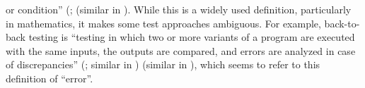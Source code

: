 \begin{enumerate}
          or condition'' \ifnotpaper (\citealp[p.~128]{IEEE2010}; \else
              \cite[p.~128]{IEEE2010} (\fi similar in
          \citealp[pp.~17\=/18 to 17\=/19, 18\=/7 to 18\=/8]{SWEBOK2024}).
          While this is a widely used definition, particularly in mathematics,
          it makes some test approaches ambiguous.
          For example, back-to-back
          testing is ``testing in which two or more variants of a program are
          executed with the same inputs, the outputs are compared, and errors
          are analyzed in case of discrepancies'' \ifnotpaper
              (\citealp[p.~30]{IEEE2010}; similar in \citealpISTQB{})\else
              \cite[p.~30]{IEEE2010} (similar in \cite{ISTQB})\fi,
          which seems to refer to this definition of ``error''.


\end{enumerate}

